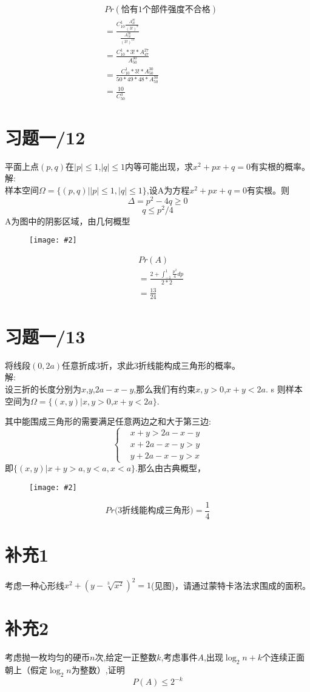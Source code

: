 \documentclass[a4paper]{ctexart}
\newcommand{\fignocaption}[2]{
	\begin{figure}[htp]
		\centering
		\texttt{[image: \#2]}
	\end{figure}
}
\begin{document}
\begin{align*}
&Pr(\text{恰有1个部件强度不合格})\\
&=\frac{C_{10}^1 \frac{A_{47}^{27}}{(3!)^9}}{\frac{A_{50}^{30}}{(3!)^{10}}}\\
&=\frac{C_{10}^{1}*3!*A_{47}^{27}}{A_{50}^{30}}\\
&=\frac{C_{10}^1*3!*A_{50}^{30}}{50*49*48*A_{50}^{30}}\\
&=\frac{10}{C_{50}^3}
\end{align*}

\section{习题一/12}
平面上点$(p,q)$在$|p|\le1$,$|q|\le1$内等可能出现，求$x^2+px+q=0$有实根的概率。\\

\noindent 解:\\
样本空间$\Omega=\{(p,q)||p|\le1,|q|\le1\}$,设A为方程$x^2+px+q=0$有实根。则\\
\[
\Delta=p^2-4q\ge0
\]
\[
q\le p^2/4
\]
A为图中的阴影区域，由几何概型\\

\fignocaption{width=0.5\textwidth}{12.jpg}

\begin{align*}
&Pr(A)\\
&=\frac{2+\int_{-1}^{1}\frac{p^2}{4}dp}{2*2}\\
&=\frac{13}{24}
\end{align*}

\section{习题一/13}
将线段$(0,2a)$任意折成3折，求此3折线能构成三角形的概率。\\
\noindent 解:\\
设三折的长度分别为$x$,$y$,$2a-x-y$,那么我们有约束$x,y>0$,$x+y<2a$.
s
则样本空间为$\Omega=\{(x,y)|x,y>0$,$x+y<2a\}$.

其中能围成三角形的需要满足任意两边之和大于第三边:
\[
\begin{cases}
&x+y>2a-x-y\\
&x+2a-x-y>y\\
&y+2a-x-y>x
\end{cases}
\]
即$\{(x,y)|x+y>a,y<a,x<a\}$.那么由古典概型，
\fignocaption{width=0.5\textwidth}{13.jpg}
\[
Pr(\text{3折线能构成三角形)}=\frac{1}{4}
\]

\section{补充1}
考虑一种心形线$x^2+(y-\sqrt[3]{x^2})^2=1$(见图)，请通过蒙特卡洛法求围成的面积。

\section{补充2}
考虑抛一枚均匀的硬币$n$次,给定一正整数$k$,考虑事件$A$,出现$\log_2 {n}+k$个连续正面朝上（假定$\log_2 n$为整数）,证明
\[
P(A)\le 2^{-k}
\]
\end{document}
